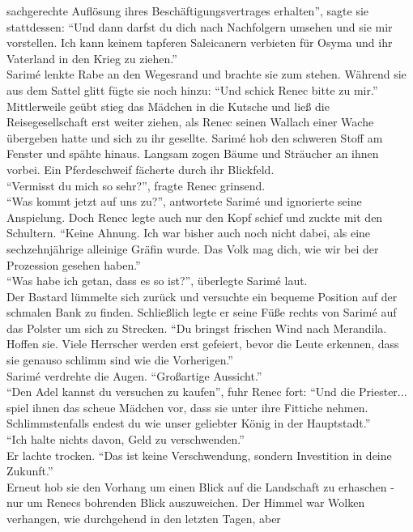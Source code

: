 sachgerechte Auflösung ihres Beschäftigungsvertrages erhalten'', sagte sie stattdessen: ``Und dann 
darfst du  dich nach Nachfolgern umsehen und sie mir vorstellen. Ich kann keinem tapferen 
Saleicanern verbieten für Osyma und ihr Vaterland in den Krieg zu ziehen.''\\
Sarimé lenkte Rabe an den Wegesrand und brachte sie zum stehen. Während sie aus dem Sattel glitt 
fügte sie noch hinzu: ``Und schick Renec bitte zu mir.''\\
Mittlerweile geübt stieg das Mädchen in die Kutsche und ließ die Reisegesellschaft erst weiter 
ziehen, als Renec seinen Wallach einer Wache übergeben hatte und sich zu ihr gesellte. Sarimé hob 
den schweren Stoff am Fenster und spähte hinaus. Langsam zogen Bäume und Sträucher an ihnen vorbei. 
Ein Pferdeschweif fächerte durch ihr Blickfeld. \\
``Vermisst du mich so sehr?'', fragte Renec grinsend.\\
``Was kommt jetzt auf uns zu?'', antwortete Sarimé und ignorierte seine Anspielung.
Doch Renec legte auch nur den Kopf schief und zuckte mit den Schultern. ``Keine Ahnung. Ich war 
bisher auch noch nicht dabei, als eine sechzehnjährige alleinige Gräfin wurde. Das Volk mag dich, 
wie wir bei der Prozession gesehen haben.''\\
``Was habe ich getan, dass es so ist?'', überlegte Sarimé laut.\\
Der Bastard lümmelte sich zurück und versuchte ein bequeme Position auf der schmalen Bank zu 
finden. Schließlich legte er seine Füße rechts von Sarimé auf das Polster um sich zu Strecken. ``Du 
bringst frischen Wind nach Merandila. Hoffen sie. Viele Herrscher werden erst gefeiert, bevor die 
Leute erkennen, dass sie genauso schlimm sind wie die Vorherigen.''\\
Sarimé verdrehte die Augen. ``Großartige Aussicht.''\\
``Den Adel kannst du versuchen zu kaufen'', fuhr Renec fort: ``Und die Priester... spiel ihnen das 
scheue Mädchen vor, dass sie unter ihre Fittiche nehmen. Schlimmstenfalls endest du wie unser 
geliebter König in der Hauptstadt.''\\
``Ich halte nichts davon, Geld zu verschwenden.''\\
Er lachte trocken. ``Das ist keine Verschwendung, sondern Investition in deine Zukunft.''\\
Erneut hob sie den Vorhang um einen Blick auf die Landschaft zu erhaschen - nur um Renecs bohrenden 
Blick auszuweichen. Der Himmel war Wolken verhangen, wie durchgehend in den letzten Tagen, aber 
